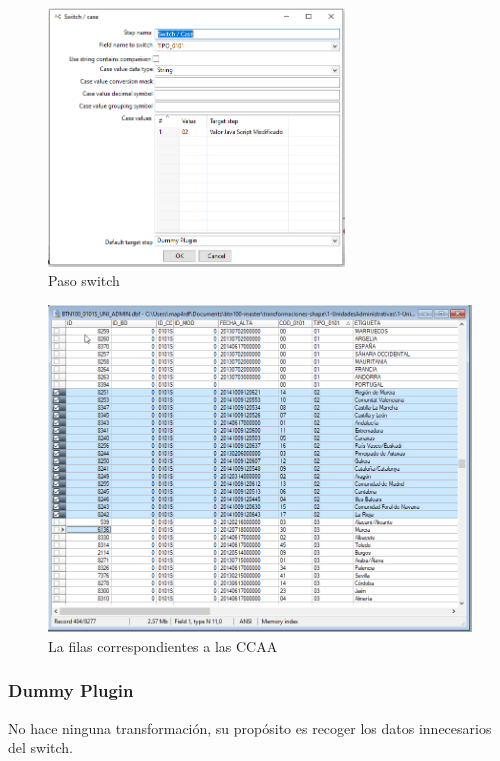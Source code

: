 \begin{figure}[H]
    \includegraphics[width=0.7\textwidth]{images/switch.png}
    \centering
    \caption{Paso switch}
    \label{fig:switch}
\end{figure}

\begin{figure}[H]
    \includegraphics[width=\textwidth]{images/tipo02.png}
    \centering
    \caption{La filas correspondientes a las CCAA}
    \label{fig:tipo02}
\end{figure}

\subsubsection{Dummy Plugin}
No hace ninguna transformación, su propósito es recoger los datos innecesarios del switch.

